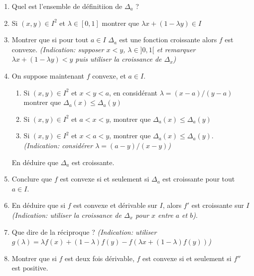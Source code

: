 \documentclass{article}
\begin{document}
\begin{enumerate}
    \item Quel est l'ensemble de définitiion de $\Delta_a$ ?
    \item Si $(x,y) \in I^2$ et $\lambda \in [0,1]$ 
        montrer que $\lambda x + (1 - \lambda y) \in I$
    \item Montrer que si pour tout $a \in I$ $\Delta_a$ 
        est une fonction croissante alors $f$ est convexe.
        \emph{(Indication: supposer $x < y$, $\lambda \in ]0,1[$ 
            et remarquer 
            $\lambda x + (1 - \lambda y) < y$
            puis utiliser la croissance de $\Delta_x$)}
    
    \item On suppose maintenant $f$ convexe, et $a \in I$.
        \begin{enumerate}
            \item Si $(x,y) \in I^2$ et $x < y < a$, en considérant 
                $\lambda = (x - a) / (y-a)$ montrer que 
                $\Delta_a (x) \leq \Delta_a (y)$

            \item Si $(x,y) \in I^2$ et $a < x < y$, montrer que 
                $\Delta_a(x) \leq \Delta_a (y)$

            \item Si $(x,y) \in I^2$ et $x < a < y$, montrer 
                que $\Delta_a (x) \leq \Delta_a (y)$. 
                \emph{(Indication: considérer $\lambda = (a - y)/(x-y)$)}
        \end{enumerate}
        En déduire que $\Delta_a$ est croissante.
    \item Conclure que $f$ est convexe si et seulement si $\Delta_a$ est 
        croissante pour tout $a \in I$.
   
    \item En déduire que si $f$ est convexe et dérivable sur $I$, alors $f'$ 
        est croissante sur $I$ \emph{(Indication: utiliser la croissance de $\Delta_x$ 
        pour $x$ entre $a$ et $b$)}.

    \item Que dire de la réciproque ? \emph{(Indication: utiliser 
            $g(\lambda) = \lambda f(x) + (1 - \lambda)f(y) - f (\lambda x +
            (1-\lambda) f (y))$)}

    \item Montrer que si $f$ est deux fois dérivable, $f$ est convexe 
        si et seulement si $f''$ est positive.
\end{enumerate}
\end{document}
